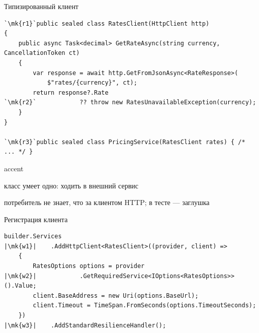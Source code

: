 \documentclass[aspectratio=169,10pt,t]{beamer}
\newcommand{\codexs}{\ttfamily\fontsize{7.0}{8.3}\selectfont}
\newcommand{\mk}[1]{\tikz[remember picture,overlay]\coordinate (#1) at (0,0.55ex);}
\begin{document}
\begin{frame}[fragile]{Типизированный клиент}
  \vspace{0.3em}
\begin{lstlisting}[style=csharp,basicstyle=\codexs,escapechar=`]
`\mk{r1}`public sealed class RatesClient(HttpClient http)
{
    public async Task<decimal> GetRateAsync(string currency, CancellationToken ct)
    {
        var response = await http.GetFromJsonAsync<RateResponse>(
            $"rates/{currency}", ct);
        return response?.Rate
`\mk{r2}`            ?? throw new RatesUnavailableException(currency);
    }
}

`\mk{r3}`public sealed class PricingService(RatesClient rates) { /* ... */ }
\end{lstlisting}

  \vspace{0.6em}
  \begin{cbul}{accent}
    \item класс умеет одно: ходить в  внешний сервис
    \item потребитель не знает, что за клиентом HTTP; в тесте --- заглушка
  \end{cbul}
\end{frame}

\begin{frame}[fragile]{Регистрация клиента}
  \slidetop

\begin{lstlisting}[style=csharp,basicstyle=\codexs,escapechar=|]
builder.Services
|\mk{w1}|    .AddHttpClient<RatesClient>((provider, client) =>
    {
        RatesOptions options = provider
|\mk{w2}|            .GetRequiredService<IOptions<RatesOptions>>().Value;
        client.BaseAddress = new Uri(options.BaseUrl);
        client.Timeout = TimeSpan.FromSeconds(options.TimeoutSeconds);
    })
|\mk{w3}|    .AddStandardResilienceHandler();
\end{lstlisting}

  \slidegap
\end{frame}
\end{document}
